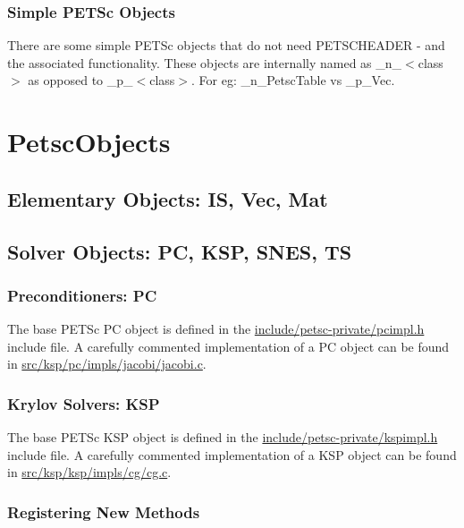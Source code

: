 \documentclass[twoside,12pt]{../sty/report_petsc}
\begin{document}
\subsection{Simple PETSc Objects}

There are some simple PETSc objects that do not need PETSCHEADER - and
the associated functionality. These objects are internally named as
\_n\_$<$class$>$ as opposed to \_p\_$<$class$>$. For eg: \_n\_PetscTable
vs \_p\_Vec.

\chapter{PetscObjects}

\section{Elementary Objects: IS, Vec, Mat}

\section{Solver Objects: PC, KSP, SNES, TS}

\subsection{Preconditioners: PC}

The base PETSc PC object is defined in the  \href{http://www.mcs.anl.gov/petsc/petsc-dev/include/petsc-private/pcimpl.h.html}{include/petsc-private/pcimpl.h} include file.
A carefully commented implementation of a PC object can be found in
\href{http://www.mcs.anl.gov/petsc/petsc-dev/src/ksp/pc/impls/jacobi/jacobi.c.html}{src/ksp/pc/impls/jacobi/jacobi.c}.


\subsection{Krylov Solvers: KSP}
The base PETSc KSP object is defined in the \href{http://www.mcs.anl.gov/petsc/petsc-dev/include/petsc-private/kspimpl.h.html}{include/petsc-private/kspimpl.h} include file.
A carefully commented implementation of a KSP object can be found in
\href{http://www.mcs.anl.gov/petsc/petsc-dev/src/ksp/ksp/impls/cg/cg.c.html}{src/ksp/ksp/impls/cg/cg.c}.

\subsection{Registering New Methods}
\label{sec:registeringnewmethods}
\end{document}
